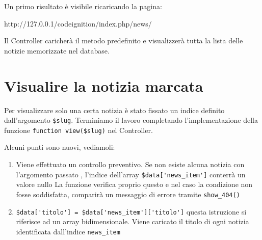 
Un primo risultato è visibile ricaricando la pagina:

\begin{code}
http://127.0.0.1/codeignition/index.php/news/
\end{code}

Il Controller caricherà il metodo predefinito e visualizzerà tutta la lista delle notizie memorizzate nel database. 

\section*{Visualire la notizia marcata}
Per visualizzare solo una certa notizia è stato fissato un indice definito dall'argomento \verb|$slug|. Terminiamo il lavoro completando l'implementazione della funzione \verb|function view($slug)| nel Controller.


Alcuni punti sono nuovi, vediamoli:

\begin{enumerate}
\item Viene effettuato un controllo preventivo. Se non esiste alcuna notizia con l'argomento passato , l'indice dell'array \verb|$data['news_item']| conterrà un valore nullo La funzione  verifica proprio questo e nel caso la condizione non fosse soddisfatta, comparirà un messaggio di errore tramite \verb|show_404()|
\item \verb|$data['titolo'] = $data['news_item']['titolo']| questa istruzione si riferisce ad un array bidimensionale. Viene caricato il titolo di ogni notizia identificata dall'indice \verb|news_item|
\end{enumerate}

